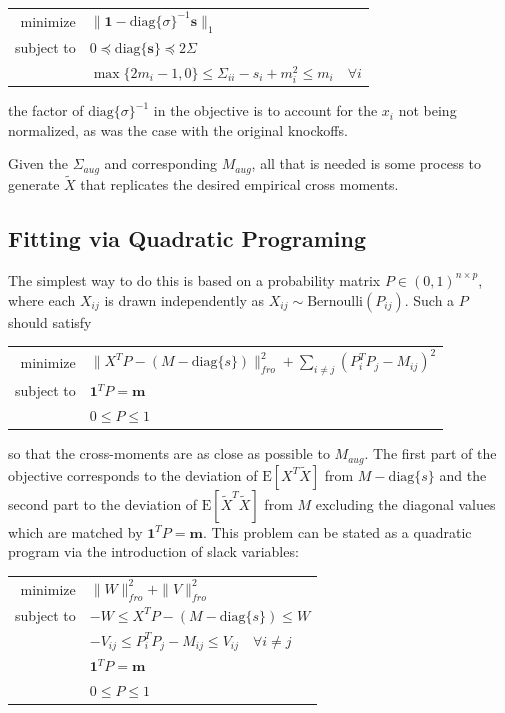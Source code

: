 \documentclass[11pt]{article}
\newcommand{\E}{\mathrm{E}}
\newcommand{\diag}[1]{\mathrm{diag}\{#1\}}
\theoremstyle{definition}
\begin{document}
            \begin{center}
                \begin{tabular}{r l}
                    minimize & $\|\mathbf 1-\diag{\sigma}^{-1}\mathbf s\|_1$ \\
                    subject to & $ 0 \preceq \diag{\mathbf s} \preceq 2\Sigma $ \\
                               & $ \max\{2m_i -1,0\} \leq \Sigma_{ii}-s_i + m_i^2 \leq m_i  \quad \forall i$
                \end{tabular} 
            \end{center} 
            the factor of $\diag{\sigma}^{-1}$ in the objective is to account for the $x_i$ not being normalized, as was the case with the original knockoffs. \par
            Given the $\Sigma_{aug}$ and corresponding $M_{aug}$, all that is needed is some process to generate $\tilde X$ that replicates the desired empirical cross moments. 


\subsection{Fitting via Quadratic Programing}
        The simplest way to do this is based on a probability matrix $P\in (0,1)^{n\times p}$, where each $X_{ij}$ is drawn independently as $X_{ij}\sim\textrm{Bernoulli}(P_{ij})$. Such a $P$ should satisfy 
            \begin{center}
                \begin{tabular}{r l}
                    minimize     & $\|X^TP-(M-\diag{s})\|_{fro}^2 + \sum_{i\neq j}(P_i^T P_j - M_{ij})^2 $\\
                    subject to   & $ \mathbf 1^T P = \mathbf m $ \\
                                 & $0 \leq P \leq 1$
                \end{tabular} 
            \end{center}
            so that the cross-moments are as close as possible to $M_{aug}$. The first part of the objective corresponds to the deviation of $\E[X^T\tilde X]$ from $M-\diag{s}$ and the second part to the deviation of $\E[\tilde X^T \tilde X]$ from $M$ excluding the diagonal values which are matched by $ \mathbf 1^T P = \mathbf m $. This problem can be stated as a quadratic program via the introduction of slack variables:
            \begin{center}
                \begin{tabular}{r l}
                    minimize     & $\|W\|_{fro}^2 + \|V\|_{fro}^2 $ \\
                    subject to   & $ -W \leq X^TP-(M-\diag{s})\leq W $ \\
                                 & $ -V_{ij} \leq P_i^T P_j - M_{ij} \leq V_{ij} \quad \forall i\neq j$ \\
                                 & $ \mathbf 1^T P = \mathbf m $ \\
                                 & $0 \leq P \leq 1$
                \end{tabular} 
            \end{center}
\end{document}
